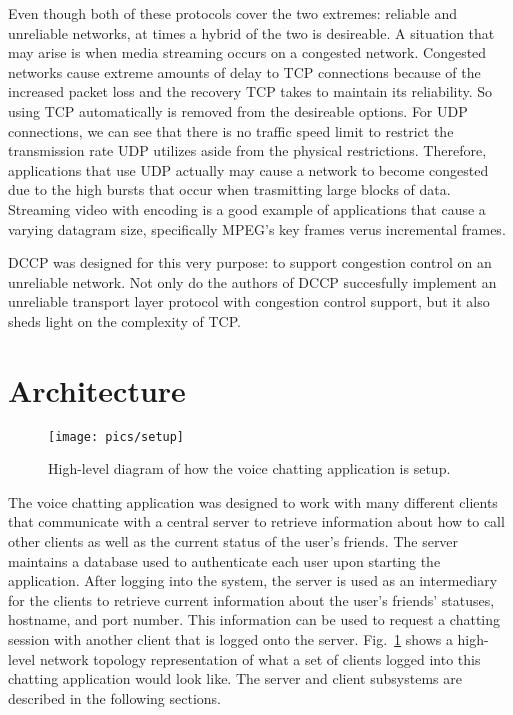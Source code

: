\documentclass[letterpaper, 9 pt, balance, conference]{ieeeconf}
\begin{document}
Even though both of these protocols cover the two extremes: reliable and unreliable
networks, at times a hybrid of the two is desireable.  A situation
that may arise is when media streaming occurs on a congested network. 
Congested networks cause extreme amounts of delay to TCP connections because of
the increased packet loss and the recovery TCP takes to maintain its reliability. 
So using TCP automatically is removed from the desireable options.  For
UDP connections, we can see that there is no traffic speed limit to restrict the
transmission rate UDP utilizes aside from the physical restrictions.  Therefore, 
applications that use UDP actually
may cause a network to become congested due to the high bursts that occur when
trasmitting large blocks of data.  Streaming video with encoding is a good example 
of applications that cause a varying datagram size, specifically MPEG's key frames
verus incremental frames.

DCCP was designed for this very purpose: to support congestion control on an 
unreliable network.  Not only do the authors of DCCP succesfully implement an 
unreliable transport layer protocol with congestion control support, but it also 
sheds light on the complexity of TCP.

\section{Architecture}
\label{sec:architec}

\begin{figure}[h]
   \centering
      \texttt{[image: pics/setup]}
   \caption{High-level diagram of how the voice chatting application is setup.}
\label{fig:setup}
\end{figure}

The voice chatting application was designed to work with many different clients
that communicate with a central server to retrieve information about how to call
other clients as well as the current status of the user's friends. The server 
maintains a database used to authenticate each user upon starting the application.
After logging into the system, the server is used as an intermediary for the clients
to retrieve current information about the user's friends' statuses, hostname, and
port number. This information can be used to request a chatting session with another
client that is logged onto the server.  Fig.~\ref{fig:setup} shows a high-level
network topology representation of what a set of clients logged into this chatting 
application would look like.  The server and client subsystems are described in
the following sections.
\end{document}
